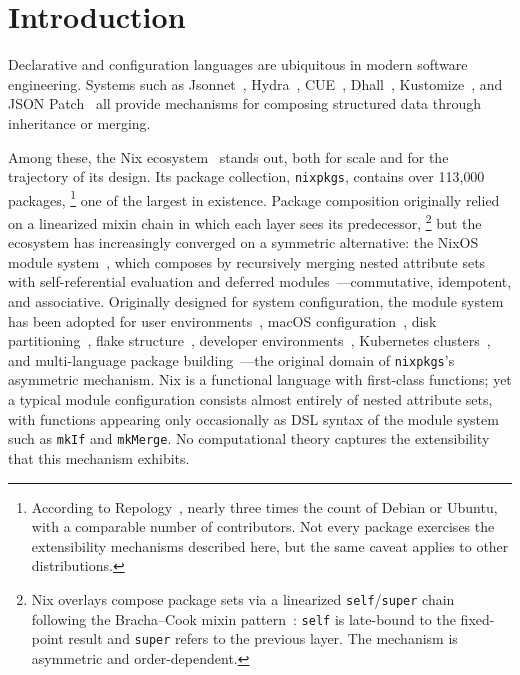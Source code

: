 \section{Introduction}
\label{sec:introduction}

Declarative and configuration languages are ubiquitous in modern
software engineering.
Systems such as Jsonnet~\cite{jsonnet}, Hydra~\cite{hydra2023},
CUE~\cite{cue2019}, Dhall~\cite{dhall2017},
Kustomize~\cite{kustomize}, and JSON
Patch~\cite{rfc6902-json-patch} all provide mechanisms for
composing structured data through inheritance or merging.

Among these, the Nix ecosystem~\cite{dolstra2010-nixos} stands out,
both for scale and for the trajectory of its design.
Its package collection, \texttt{nixpkgs}, contains over
113{,}000 packages,%
\footnote{
  According to Repology~\cite{repology2025},
  nearly three times the count of Debian or Ubuntu,
  with a comparable number of contributors.
  Not every package exercises the extensibility mechanisms
  described here, but the same caveat applies to other distributions.
}
one of the largest in existence.
Package composition originally relied on a linearized mixin
chain in which each layer sees its predecessor,%
\footnote{
  Nix overlays compose package sets via a linearized
  \texttt{self}/\texttt{super} chain following the
  Bracha--Cook mixin pattern~\cite{bracha1990-mixin-inheritance}:
  \texttt{self} is late-bound to the fixed-point result
  and \texttt{super} refers to the previous layer.
  The mechanism is asymmetric and order-dependent.
}
but the ecosystem has increasingly converged on a symmetric
alternative: the NixOS module
system~\cite{dolstra2010-nixos,nixosmodules}, which composes by
recursively merging nested attribute sets with self-referential
evaluation and deferred modules~\cite{nixosmodules}---commutative,
idempotent,
and associative.
Originally designed for system configuration, the module system
has been adopted for user environments~\cite{homemanager},
macOS configuration~\cite{nixdarwin},
disk partitioning~\cite{disko},
flake structure~\cite{flakeparts},
developer environments~\cite{devenv},
Kubernetes clusters~\cite{kubenix,nixidy},
and multi-language package building~\cite{dream2nix}---the
original domain of \texttt{nixpkgs}'s asymmetric mechanism.
Nix is a functional language with first-class functions;
yet a typical module configuration consists almost entirely of
nested attribute sets, with functions appearing only
occasionally as DSL syntax of the module system
such as \texttt{mkIf} and \texttt{mkMerge}.
No computational theory captures the extensibility that this
mechanism exhibits.

